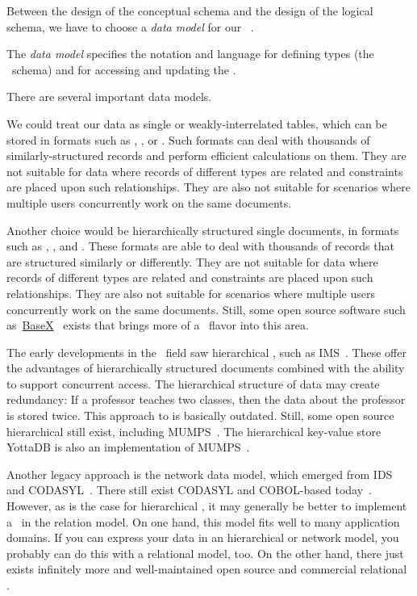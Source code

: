 %
\label{sec:dbModelSelection}%
%
Between the design of the conceptual schema and the design of the logical schema, we have to choose a \emph{data model} for our \db~\cite{SS2005EIDDDFDB:I}.%
%
\begin{definition}%
The \emph{data model} specifies the notation and language for defining types (the \db\ schema) and for accessing and updating the \db.%
\end{definition}%
%
There are several important data models.

We could treat our data as single or weakly-interrelated tables, which can be stored in formats such as , , or .
Such formats can deal with thousands of similarly-structured records and perform efficient calculations on them.
They are not suitable for data where records of different types are related and constraints are placed upon such relationships.
They are also not suitable for scenarios where multiple users concurrently work on the same documents.

Another choice would be hierarchically structured single documents, in formats such as , , and .
These formats are able to deal with thousands of records that are structured similarly or differently.
They are not suitable for data where records of different types are related and constraints are placed upon such relationships.
They are also not suitable for scenarios where multiple users concurrently work on the same documents.
Still, some open source software such as~\href{https://basex.org}{BaseX}~\cite{GHS2010B,G2006PXMMDTTL} exists that brings more of a \db\ flavor into this area.

The early developments in the \db\ field saw hierarchical , such as IMS~\cite{KLBGNLWBS2012ITIYCGTIIMS,BBP2007TBOI,KC2024DS:ITD}.
These offer the advantages of hierarchically structured documents combined with the ability to support concurrent access.
The hierarchical structure of data may create redundancy:
If a professor teaches two classes, then the data about the professor is stored twice.
This approach to  is basically outdated.
Still, some open source hierarchical  still exist, including MUMPS~\cite{O2008TMPL,O2025TMPL}.
The hierarchical key-value store YottaDB is also an implementation of MUMPS~\cite{B2018THALOMMATFOY}.

Another legacy approach is the network data model, which emerged from IDS~\cite{B2009TOOTIDSITFDAD,B1965SFRAP,H2016HCBITDAFOODW} and CODASYL~\cite{TF1976CDBMS}.
There still exist CODASYL and COBOL-based  today~\cite{O2022OCDDARM}.
However, as is the case for hierarchical , it may generally be better to implement a \db\ in the relation model.
On one hand, this model fits well to many application domains.
If you can express your data in an hierarchical or network model, you probably can do this with a relational model, too.
On the other hand, there just exists infinitely more and well-maintained open source and commercial relational .

